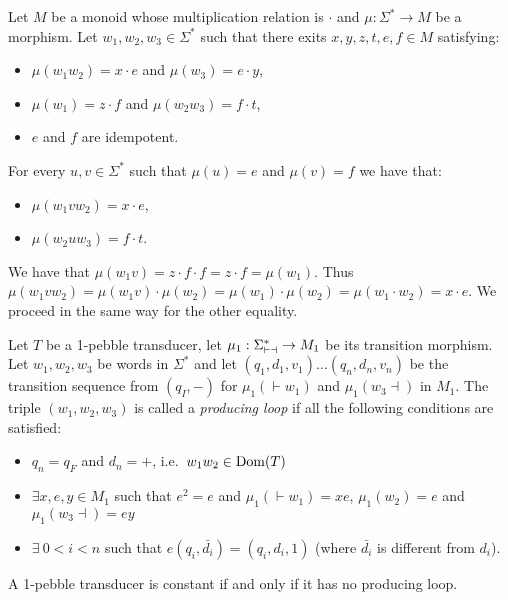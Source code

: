 \begin{lemma}
Let $M$ be a monoid whose multiplication relation is $\cdot$ and $\mu:\Sigma^*\to M$ be a morphism. Let $w_1,w_2, w_3\in\Sigma^*$ such that there exits $x,y,z,t,e,f\in M$ satisfying:
\begin{itemize}
\item $\mu(w_1w_2)=x\cdot e$ and $\mu(w_3)=e\cdot y$,
\item $\mu(w_1)=z\cdot f$ and $\mu(w_2w_3)=f\cdot t$,
\item $e$ and $f$ are idempotent.
\end{itemize}
For every $u, v\in\Sigma^*$ such that $\mu(u)=e$ and $\mu(v)=f$ we have that:
\begin{itemize}
\item $\mu(w_1vw_2)=x\cdot e$, 
\item $\mu(w_2uw_3)=f\cdot t$.
\end{itemize}
\end{lemma}

\begin{pr}
We have that $\mu(w_1v)=z\cdot f\cdot f=z\cdot f=\mu(w_1)$.
Thus $\mu(w_1vw_2)=\mu(w_1v)\cdot \mu(w_2)=\mu(w_1)\cdot \mu(w_2)=\mu(w_1\cdot w_2) =x\cdot e$.
We proceed in the same way for the other equality.
\end{pr}

\begin{definition}
Let $T$ be a 1-pebble transducer, let $\mu_1:\Sigma_{\vdash \dashv}^*\rightarrow M_1$ be its transition morphism.
Let $w_1,w_2, w_3$ be words in $\Sigma^*$ and let $(q_1,d_1,v_1)\ldots (q_n,d_n,v_n)$ be the transition sequence from $(q_I,{-})$ for $\mu_1({\vdash} w_1)$ and $\mu_1(w_3{\dashv})$ in $M_1$.
The triple $(w_1,w_2,w_3)$ is called a \emph{producing loop} if all the following conditions are satisfied:
\begin{itemize}
\item $q_n=q_F$ and $d_n={+}$, i.e.~$w_1w_2\in \operatorname{\mathrm{Dom}}(T)$
\item $\exists x,e,y\in M_1$ such that $e^2=e$ and $\mu_1({\vdash} w_1)=xe$, $\mu_1(w_2)=e$ and $\mu_1(w_3{\dashv})=ey$
\item $\exists\ 0<i<n$ such that $e(q_i,\bar{d_i})=(q_i,d_i,1)$ (where $\bar{d_i}$ is different from $d_i$).
\end{itemize}
\end{definition}

\begin{theorem}
A 1-pebble transducer is constant if and only if it has no producing loop.
\end{theorem}
